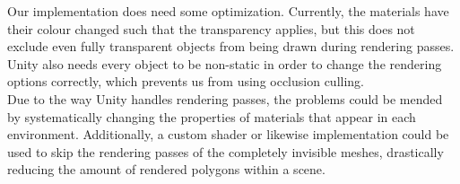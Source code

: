 Our implementation does need some optimization. Currently, the materials have their colour changed such that the transparency applies, but this does not exclude even fully transparent objects from being drawn during rendering passes. Unity also needs every object to be non-static in order to change the rendering options correctly, which prevents us from using occlusion culling.\\

Due to the way Unity handles rendering passes, the problems could be mended by systematically changing the properties of materials that appear in each environment. Additionally, a custom shader or likewise implementation could be used to skip the rendering passes of the completely invisible meshes, drastically reducing the amount of rendered polygons within a scene.\\